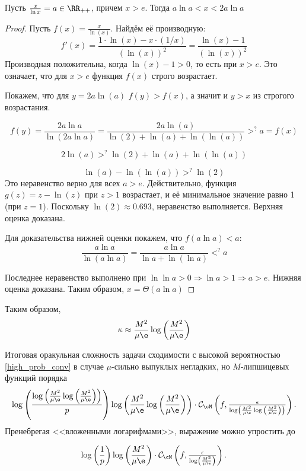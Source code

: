 \begin{lemma}
Пусть $\frac{x}{\ln{x}} = a \in \RR_{++}$, причем $x > e$. Тогда $a \ln{a} < x < 2a \ln{a}$
\end{lemma}
\begin{proof}
Пусть \(f(x) = \frac{x}{\ln(x)}\). Найдём её производную:
    \[ f'(x) = \frac{1 \cdot \ln(x) - x \cdot (1/x)}{(\ln(x))^2} = \frac{\ln(x) - 1}{(\ln(x))^2} \]
    Производная положительна, когда \( \ln(x) - 1 > 0 \), то есть при \(x > e\). Это означает, что для \(x > e\) функция \(f(x)\) строго возрастает.

    Покажем, что для \(y = 2a \ln(a)\) \(f(y) > f(x)\), а значит и \(y > x\) из строгого возрастания.
    
    \[ f(y) = \frac{2a \ln{a}}{\ln{(2a \ln{a})}} = \frac{2a \ln(a)}{\ln(2) + \ln(a) + \ln(\ln(a))} >^? a = f(x)\]
    
    \[ 2 \ln(a) >^? \ln(2) + \ln(a) + \ln(\ln(a)) \]

    \[ \ln(a) - \ln(\ln(a)) >^? \ln(2) \]
    Это неравенство верно для всех \(a > e\). Действительно, функция \(g(z) = z - \ln(z)\) при \(z>1\) возрастает, и её минимальное значение равно 1 (при $z=1$). Поскольку \( \ln(2) \approx 0.693 \), неравенство выполняется. Верхняя оценка доказана.

    Для доказательства нижней оценки покажем, что $f(a \ln{a}) < a$:
    \[\frac{a\ln{a}}{\ln{(a\ln{a})}} = \frac{a\ln{a}}{\ln{a} + \ln{(\ln{a})}} <^? a\]

    Последнее неравенство выполнено при $\ln{\ln{a}} > 0 \Rightarrow \ln{a} > 1 \Rightarrow a > e$. Нижняя оценка доказана. Таким образом, $x = \Theta{\left(a \ln{a}\right)}$
    
\end{proof}

Таким образом, 
\begin{equation*}
    \kappa \approx \frac{M^2}{\mu \e} \log{\left(\frac{M^2}{\mu \e}\right)}
\end{equation*}

\begin{theorem}[Рубцов, 2025] \label{th:mu-nonconvex}
    Итоговая оракульная сложность задачи сходимости с высокой вероятностью \eqref{high_prob_conv} в случае $\mu$-сильно выпуклых негладких, но $M$-липшицевых функций  порядка
    $$ \log\left(\frac{\log\left(\frac{M^2}{\mu \e} \log{\left(\frac{M^2}{\mu \e}\right)}\right)}{p}\right)\log\left(\frac{M^2}{\mu \e} \log{\left(\frac{M^2}{\mu \e}\right)}\right)\cdot \mathcal{C}_{\cM}\left(f,\tfrac{\epsilon}{\log\left(\frac{M^2}{\mu \e} \log{\left(\frac{M^2}{\mu \e}\right)}\right)}\right).$$
    Пренебрегая <<вложенными логарифмами>>, выражение можно упростить до

    $$ \log\left(\frac{1}{p}\right)\log\left(\frac{M^2}{\mu \e}\right)\cdot \mathcal{C}_{\cM}\left(f,\tfrac{\epsilon}{\log\left(\frac{M^2}{\mu \e} \right)}\right).$$
\end{theorem}

